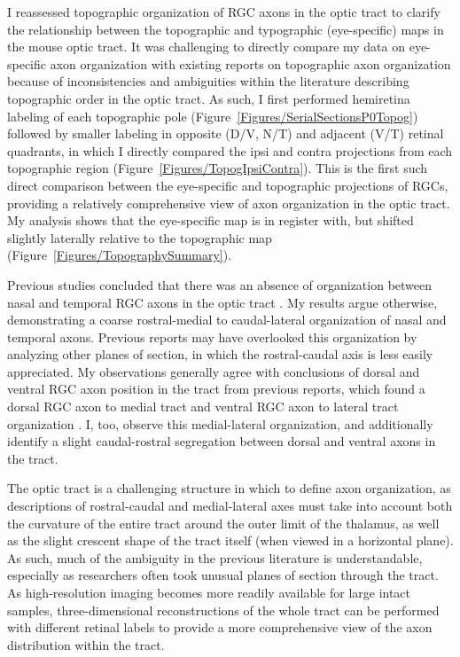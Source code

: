 \label{sec:TopogDiscuss}
I reassessed topographic organization of RGC axons in the optic tract to clarify the relationship between the topographic and typographic (eye-specific) maps in the mouse optic tract.
It was challenging to directly compare my data on eye-specific axon organization with existing reports on topographic axon organization because of inconsistencies and ambiguities within the literature describing topographic order in the optic tract.
As such, I first performed hemiretina labeling of each topographic pole (Figure~\ref{Figures/SerialSectionsP0Topog}) followed by smaller labeling in opposite (D/V, N/T) and adjacent (V/T) retinal quadrants, in which I directly compared the ipsi and contra projections from each topographic region (Figure~\ref{Figures/TopogIpsiContra}).
This is the first such direct comparison between the eye-specific and topographic projections of RGCs, providing a relatively comprehensive view of axon organization in the optic tract.
My analysis shows that the eye-specific map is in register with, but shifted slightly laterally relative to the topographic map (Figure~\ref{Figures/TopographySummary}).

Previous studies concluded that there was an absence of organization between nasal and temporal RGC axons in the optic tract \cite{reese1993reestablishment,chan1994changes,plas2005pretarget}.
My results argue otherwise, demonstrating a coarse rostral-medial to caudal-lateral organization of nasal and temporal axons.
Previous reports may have overlooked this organization by analyzing other planes of section, in which the rostral-caudal axis is less easily appreciated.
My observations generally agree with conclusions of dorsal and ventral RGC axon position in the tract from previous reports, which found a dorsal RGC axon to medial tract and ventral RGC axon to lateral tract organization \cite{torrealba1982studies,reh1983organization,reese1990fibre,reese1993reestablishment,chan1994changes,chan1999changes,plas2005pretarget}.
I, too, observe this medial-lateral organization, and additionally identify a slight caudal-rostral segregation between dorsal and ventral axons in the tract.

The optic tract is a challenging structure in which to define axon organization, as descriptions of rostral-caudal and medial-lateral axes must take into account both the curvature of the entire tract around the outer limit of the thalamus, as well as the slight crescent shape of the tract itself (when viewed in a horizontal plane).
As such, much of the ambiguity in the previous literature is understandable, especially as researchers often took unusual planes of section through the tract.
As high-resolution imaging becomes more readily available for large intact samples, three-dimensional reconstructions of the whole tract can be performed with different retinal labels to provide a more comprehensive view of the axon distribution within the tract.

